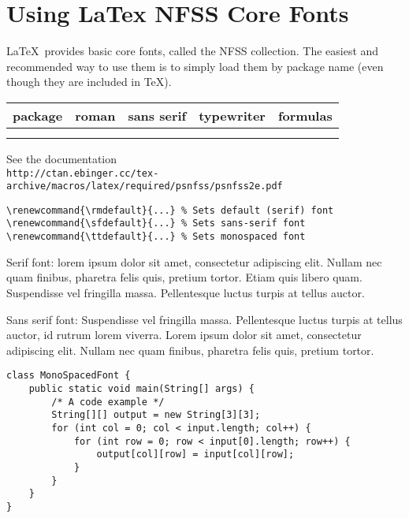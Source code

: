 \documentclass{article}
\begin{document}
\section*{Using LaTex NFSS Core Fonts}

\LaTeX\ provides basic core fonts, called the NFSS collection. The easiest and
recommended way to use them is to simply load them by package name (even though
they are included in \TeX).

\medskip

\begin{tabular}{ | l | l l l l |}
    \hline
    package     & roman     & sans serif    & typewriter      & formulas \\
    \hline & & & &\\
    \hline \\
\end{tabular}

\bigskip\noindent See the documentation \\
\texttt{http://ctan.ebinger.cc/tex-archive/macros/latex/required/psnfss/psnfss2e.pdf}

\begin{verbatim}
\renewcommand{\rmdefault}{...} % Sets default (serif) font
\renewcommand{\sfdefault}{...} % Sets sans-serif font
\renewcommand{\ttdefault}{...} % Sets monospaced font
\end{verbatim}

\renewcommand{\rmdefault}{ptm}
\renewcommand{\sfdefault}{phv}
\renewcommand{\ttdefault}{pcr}

\noindent\textrm{Serif font: lorem ipsum dolor sit amet, consectetur adipiscing
elit. Nullam nec quam finibus, pharetra felis quis, pretium tortor. Etiam quis
libero quam. Suspendisse vel fringilla massa. Pellentesque luctus turpis at
tellus auctor.}

\bigskip\noindent\textsf{Sans serif font: Suspendisse vel fringilla massa.
Pellentesque luctus turpis at tellus auctor, id rutrum lorem viverra. Lorem
ipsum dolor sit amet, consectetur adipiscing elit. Nullam nec quam finibus,
pharetra felis quis, pretium tortor.}

\begin{verbatim}
class MonoSpacedFont {
    public static void main(String[] args) {
        /* A code example */
        String[][] output = new String[3][3];
        for (int col = 0; col < input.length; col++) {
            for (int row = 0; row < input[0].length; row++) {
                output[col][row] = input[col][row];
            }
        }
    }
}
\end{verbatim}
\end{document}
